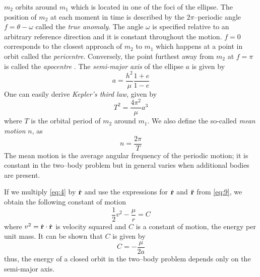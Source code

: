 \documentclass[twoside,openright,titlepage,numbers=noenddot,headinclude,%
                footinclude=true,cleardoublepage=empty,abstractoff, 
                BCOR=5mm,paper=a4,fontsize=11pt,%
                american,%
                ]{scrreprt}%
\begin{document}
$m_2$ orbits around $m_1$ which is located in one of the foci of the ellipse.
The position of $m_2$ at each moment in time is described by the $2\pi$--periodic
angle 
$f=\theta - \omega$ called the \emph{true anomaly}. The angle $\omega$ is specified 
relative to an arbitrary reference direction and it is constant throughout the 
motion. $f=0$ corresponds to the closest approach of $m_2$ to $m_1$ which 
happens at a point in orbit called 
the \emph{pericentre}. Conversely, the point furthest away from 
$m_2$ at $f=\pi$ is called the \emph{apocentre} . 
The \emph{semi-major axis} of the ellipse $a$ is given by
\begin{equation}
    a= \frac{h^2}{\mu} \frac{1+e}{1-e} 
\end{equation}
One can easily derive \citep[ex.][]{murray} \emph{Kepler's third law}, given by
\begin{equation}
    T^2= \frac{4\pi^2}{\mu} a^3
    \label{eq:kepler_law}
\end{equation}
where $T$ is the orbital period of $m_2$ around $m_1$. We also define the so-called
\emph{mean motion} $n$, as
\begin{equation}
    n= \frac{2\pi}{T} 
\end{equation}
The mean motion is the average angular frequency of the periodic motion; it is 
constant in the two--body problem but in general varies when additional bodies are 
present.

If we multiply \cref{eq:4} by $\dot{\boldsymbol{\mathbf{r}}}$ and use the expressions for
$\dot{\boldsymbol{\mathbf{r}}}$ and $\ddot{\boldsymbol{\mathbf{r}}}$ from \cref{eq:9}, we obtain the following
constant of motion
\begin{equation}
    \frac{1}{2} v^2 - \frac{\mu}{r} =C
\end{equation}
where $v^2=\dot{\boldsymbol{\mathbf{r}}}\cdot\dot{\boldsymbol{\mathbf{r}}}$ is velocity squared and $C$ is a
constant of motion, the energy per unit mass. It can be shown \citep{murray}
that $C$ is given by
\begin{equation}
    C= -\frac{\mu}{2a} 
\end{equation}
thus, the energy of a closed orbit in the two--body problem depends only on the semi-major axis.
\end{document}
